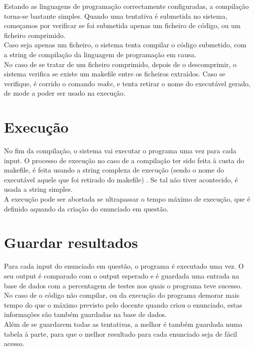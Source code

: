 Estando as linguagens de programação correctamente configuradas, a compilação torna-se bastante simples. Quando uma tentativa
é submetida no sistema, começamos por verificar se foi submetida apenas um ficheiro de código, ou um ficheiro comprimido.\\
Caso seja apenas um ficheiro, o sistema tenta compilar o código submetido, com a string de compilação da linguagem de programação em causa.\\
No caso de se tratar de um ficheiro comprimido, depois de o descomprimir, o sistema verifica se existe um makefile entre os ficheiros extraídos. Caso se verifique, é corrido o comando \textit{make}, e tenta retirar o nome do executável gerado, de mode a poder
ser usado na execução.

\section{Execução}\label{sec exec}
No fim da compilação, o sistema vai executar o programa uma vez para cada input. O processo de execução no caso de a compilação ter
sido feita à custa do makefile, é feita usando a string complexa de execução (sendo o nome do executável aquele que foi retirado do
makefile) . Se tal não tiver acontecido, é usada a string simples.\\
A execução pode ser abortada se ultrapassar o tempo máximo de execução, que é definido aquando da criação do enunciado em
questão.

\section{Guardar resultados}\label{sec res}
Para cada input do enunciado em questão, o programa é executado uma vez. O seu output é comparado com o output esperado e 
é guardada uma entrada na base de dados com a percentagem de testes nos quais o programa teve sucesso.\\
No caso de o código não compilar, ou da execução do programa demorar mais tempo do que o máximo previsto pelo docente quando 
criou o enunciado, estas informações são também guardadas na base de dados.\\
Além de se guardarem todas as tentativas, a melhor é também guardada numa tabela à parte, para que o melhor resultado para cada
enunciado seja de fácil acesso.

